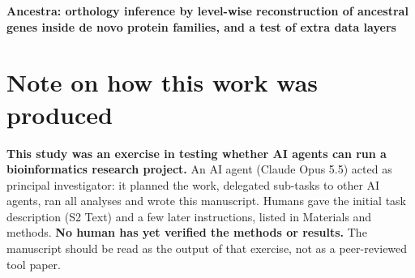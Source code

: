 \newif\ifembedfigs \embedfigstrue %
\newcommand{\pend}[1]{\textbf{[PENDING: #1]}}
\newcommand{\CI}[2]{[#1,\,#2]}


\vspace*{0.2in}

\begin{flushleft}
{\Large
\textbf{Ancestra: orthology inference by level-wise reconstruction of ancestral genes inside de novo protein families, and a test of extra data layers}
}
\end{flushleft}

\section*{Note on how this work was produced}
\textbf{This study was an exercise in testing whether AI agents can run a bioinformatics research project.} An AI agent (Claude Opus 5.5) acted as principal investigator: it planned the work, delegated sub-tasks to other AI agents, ran all analyses and wrote this manuscript. Humans gave the initial task description (S2 Text) and a few later instructions, listed in Materials and methods. \textbf{No human has yet verified the methods or results.} The manuscript should be read as the output of that exercise, not as a peer-reviewed tool paper.

